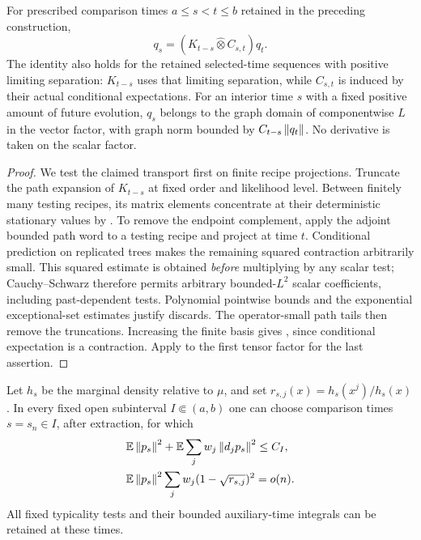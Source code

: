 \begin{proposition}
\label{prop:exact-transport}
For prescribed comparison times $a\le s<t\le b$ retained in the
preceding construction,
\begin{equation}\label{eq:exact-transport}
 q_s=(K_{t-s}\mathbin{\widehat\otimes}C_{s,t})q_t.
\end{equation}
The identity also holds for the retained selected-time sequences with
positive limiting separation: $K_{t-s}$ uses that limiting separation,
while $C_{s,t}$ is induced by their actual conditional expectations.
For an interior time $s$ with a fixed positive amount of future evolution,
$q_s$ belongs to the graph domain of componentwise $L$ in the vector
factor, with graph norm bounded by $C_{t-s}\left\lVert q_t\right\rVert$.  No derivative is
taken on the scalar factor.
\end{proposition}

\begin{proof}
We test the claimed transport first on finite recipe projections.
Truncate the path expansion of $K_{t-s}$ at fixed order and likelihood
level.  Between finitely many testing recipes, its matrix elements
concentrate at their deterministic stationary values by
.  To remove the endpoint complement, apply the
adjoint bounded path word to a testing recipe and project at time $t$.
Conditional prediction on replicated trees makes the remaining squared
contraction arbitrarily small.  This squared estimate is obtained
\emph{before} multiplying by any scalar test; Cauchy--Schwarz therefore
permits arbitrary bounded-$L^2$ scalar coefficients, including
past-dependent tests.  Polynomial pointwise bounds and the exponential
exceptional-set estimates justify discards.  The operator-small path
tails then remove the truncations.  Increasing the finite basis gives
, since conditional expectation is a contraction.
Apply  to the first tensor factor for the last
assertion.
\end{proof}

\begin{lemma}\label{lem:exact-good-times}
Let $h_s$ be the marginal density relative to $\mu$, and set
$r_{s,j}(x)=h_s(x^j)/h_s(x)$.
In every fixed open subinterval $I\Subset(a,b)$ one can choose comparison
times $s=s_n\in I$, after extraction, for which
\begin{align}
 &\mathbb E\left\lVert p_s\right\rVert^2+
   \mathbb E\sum_jw_j\left\lVert d_jp_s\right\rVert^2\le C_I,
 \label{eq:exact-hessian-budget}\\
 &\mathbb E\left\lVert p_s\right\rVert^2\sum_jw_j(1-\sqrt{r_{s,j}})^2=o(n).
 \label{eq:exact-reverse-budget}
\end{align}
All fixed typicality tests and their bounded auxiliary-time integrals
can be retained at these times.
\end{lemma}

